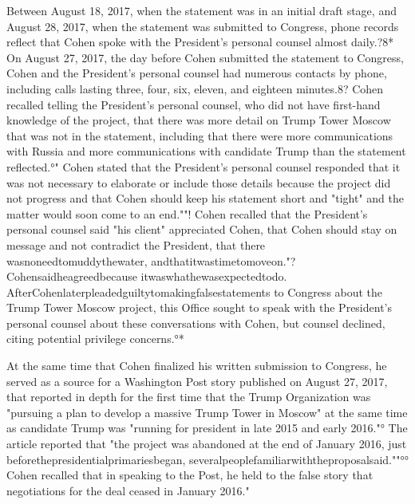 Between August 18, 2017, when the statement was in an initial draft stage, and August 28, 2017, when the statement was submitted to Congress, phone records reflect that Cohen spoke with the President's personal counsel almost daily.?8*
On August 27, 2017, the day before Cohen submitted the statement to Congress, Cohen and the President's personal counsel had numerous contacts by phone, including calls lasting three, four, six, eleven, and eighteen minutes.8?
Cohen recalled telling the President's personal counsel, who did not have first-hand knowledge of the project, that there was more detail on Trump Tower Moscow that was not in the statement, including that there were more communications with Russia and more communications with candidate Trump than the statement reflected.°"
Cohen stated that the President's personal counsel responded that it was not necessary to elaborate or include those details because the project did not progress and that Cohen should keep his statement short and "tight" and the matter would soon come to an end.""!
Cohen recalled that the President's personal counsel said "his client" appreciated Cohen, that Cohen should stay on message and not contradict the President, that there wasnoneedtomuddythewater, andthatitwastimetomoveon."?
Cohensaidheagreedbecause itwaswhathewasexpectedtodo.
AfterCohenlaterpleadedguiltytomakingfalsestatements to Congress about the Trump Tower Moscow project, this Office sought to speak with the President's personal counsel about these conversations with Cohen, but counsel declined, citing potential privilege concerns.°*

At the same time that Cohen finalized his written submission to Congress, he served as a source for a Washington Post story published on August 27, 2017, that reported in depth for the first time that the Trump Organization was "pursuing a plan to develop a massive Trump Tower in Moscow" at the same time as candidate Trump was "running for president in late 2015 and early 2016."°
The article reported that "the project was abandoned at the end of January 2016, just beforethepresidentialprimariesbegan, severalpeoplefamiliarwiththeproposalsaid.""°°
Cohen recalled that in speaking to the Post, he held to the false story that negotiations for the deal ceased in January 2016."

